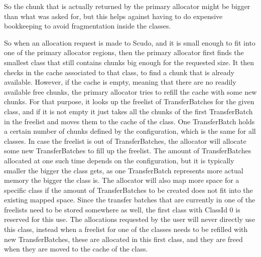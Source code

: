 \documentclass[a4paper,11pt,oneside]{report}
\begin{document}
So the chunk that is actually returned by the primary allocator might be bigger
than what was asked for, but this helps against having to do expensive bookkeeping
to avoid fragmentation inside the classes.

So when an allocation request is made to Scudo, and it is small enough to fit into
one of the primary allocator regions, then the primary allocator first finds the
smallest class that still contains chunks big enough for the requested size. It
then checks in the cache associated to that class, to find a chunk that is already
available. However, if the cache is empty, meaning that there are no readily
available free chunks, the primary allocator tries to refill the cache with some
new chunks. For that purpose, it looks up the freelist of TransferBatches for the
given class, and if it is not empty it just takes all the chunks of the first
TransferBatch in the freelist and moves them to the cache of the class. One
TransferBatch holds a certain number of chunks defined by the configuration,
which is the same for all classes.
In case the freelist is out of TransferBatches, the allocator will allocate
some new TransferBatches to fill up the freelist. The amount of TransferBatches
allocated at one such time depends on the configuration, but it is typically
smaller the bigger the class gets, as one TransferBatch represents more actual
memory the bigger the class is. The allocator will also map more space for a
specific class if the amount of TransferBatches to be created does not fit into
the existing mapped space.
Since the transfer batches that are currently in one of the freelists need to
be stored somewhere as well, the first class with ClassId 0 is reserved for
this use. The allocations requested by the user will never directly use this
class, instead when a freelist for one of the classes needs to be refilled
with new TransferBatches, these are allocated in this first class, and they
are freed when they are moved to the cache of the class.
\end{document}
